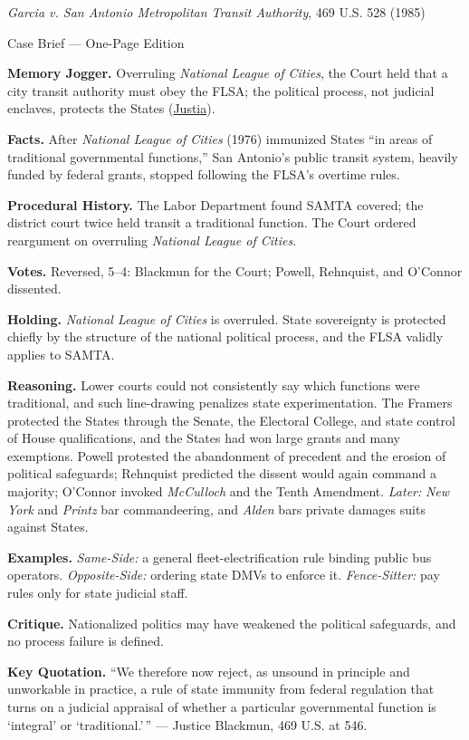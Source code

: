 \documentclass[12pt]{article}
\begin{document}
\begin{center}
{\Large \textit{Garcia v. San Antonio Metropolitan Transit Authority}, 469 U.S. 528 (1985)\par}
\vspace{0.3em}
{\normalsize Case Brief --- One-Page Edition\par}
\end{center}

\textbf{Memory Jogger.} Overruling \textit{National League of Cities}, the Court held that a city transit authority must obey the FLSA; the political process, not judicial enclaves, protects the States (\href{https://supreme.justia.com/cases/federal/us/469/528/}{Justia}).

\textbf{Facts.} After \textit{National League of Cities} (1976) immunized States ``in areas of traditional governmental functions,'' San Antonio's public transit system, heavily funded by federal grants, stopped following the FLSA's overtime rules.

\textbf{Procedural History.} The Labor Department found SAMTA covered; the district court twice held transit a traditional function. The Court ordered reargument on overruling \textit{National League of Cities}.

\textbf{Votes.} Reversed, 5--4: Blackmun for the Court; Powell, Rehnquist, and O'Connor dissented.

\textbf{Holding.} \textit{National League of Cities} is overruled. State sovereignty is protected chiefly by the structure of the national political process, and the FLSA validly applies to SAMTA.

\textbf{Reasoning.} Lower courts could not consistently say which functions were traditional, and such line-drawing penalizes state experimentation. The Framers protected the States through the Senate, the Electoral College, and state control of House qualifications, and the States had won large grants and many exemptions. Powell protested the abandonment of precedent and the erosion of political safeguards; Rehnquist predicted the dissent would again command a majority; O'Connor invoked \textit{McCulloch} and the Tenth Amendment. \emph{Later:} \textit{New York} and \textit{Printz} bar commandeering, and \textit{Alden} bars private damages suits against States.

\textbf{Examples.} \emph{Same-Side:} a general fleet-electrification rule binding public bus operators. \emph{Opposite-Side:} ordering state DMVs to enforce it. \emph{Fence-Sitter:} pay rules only for state judicial staff.

\textbf{Critique.} Nationalized politics may have weakened the political safeguards, and no process failure is defined.

\textbf{Key Quotation.} ``We therefore now reject, as unsound in principle and unworkable in practice, a rule of state immunity from federal regulation that turns on a judicial appraisal of whether a particular governmental function is `integral' or `traditional.'\,'' --- Justice Blackmun, 469 U.S. at 546.
\end{document}
